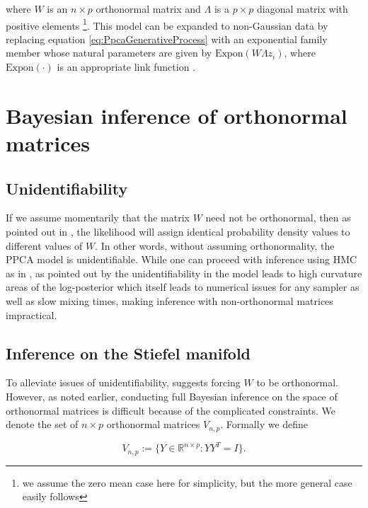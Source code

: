 \documentclass{article}
\begin{document}
where $W$ is an $n \times p$ orthonormal matrix and $\Lambda$ is a $p \times p$ diagonal matrix with positive elements \footnote{we assume the zero mean case here for simplicity, but the more general case easily follows}. This model can be expanded to non-Gaussian data by replacing equation \ref{eq:PpcaGenerativeProcess} with an exponential family member whose natural parameters are given by $\mathrm{Expon}(W\Lambda z_i)$, where $\mathrm{Expon}(\cdot)$ is an appropriate link function \citep{mohamed2009bayesian}. 

\section{Bayesian inference of orthonormal matrices}\label{orthonormal}

\subsection{Unidentifiability}
If we assume momentarily that the matrix $W$ need not be orthonormal, then as pointed out in \citet[chapt.~12.1.3]{murphy2012machine}, the likelihood will assign identical probability density values to different values of $W$. In other words, without assuming orthonormality, the PPCA model is unidentifiable. While one can proceed with inference using HMC as in \citep{mohamed2009bayesian}, as pointed out by \citet{holbrook2016bayesian} the unidentifiability in the model leads to high curvature areas of the log-posterior which itself leads to numerical issues for any sampler as well as slow mixing times, making inference with non-orthonormal matrices impractical. 

\subsection{Inference on the Stiefel manifold}
To alleviate issues of unidentifiability, \citet[chapt.~12.1.3]{murphy2012machine} suggests forcing $W$ to be orthonormal. However, as noted earlier, conducting full Bayesian inference on the space of orthonormal matrices is difficult because of the complicated constraints. We denote the set of $n \times p$ orthonormal matrices $V_{n,p}$. Formally we define

\begin{equation}
V_{n,p} := \{Y \in \mathbb{R}^{n \times p}: YY^T = I \}.
\end{equation}
\end{document}

